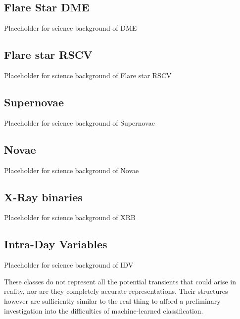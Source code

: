 	\subsection{Flare Star DME}
	Placeholder for science background of DME %
	
	\subsection{Flare star RSCV}
	Placeholder for science background of Flare star RSCV %
	
	\subsection{Supernovae}
	Placeholder for science background of Supernovae %
	
	\subsection{Novae}
	Placeholder for science background of Novae %
	
	\subsection{X-Ray binaries}
	Placeholder for science background of XRB %
	
	\subsection{Intra-Day Variables}
	Placeholder for science background of IDV %
%	
%	
	
	These classes do not represent all the potential transients that could arise in reality, nor are they completely accurate representations. Their structures however are sufficiently similar to the real thing to  afford a preliminary investigation into the difficulties of machine-learned classification.
		
